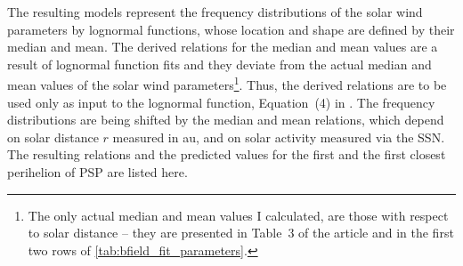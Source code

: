 \bigskip

The resulting models represent the frequency distributions of the solar wind parameters by lognormal functions, whose location and shape are defined by their median and mean.
The derived relations for the median and mean values are a result of lognormal function fits and they deviate from the actual median and mean values of the solar wind parameters\footnote{The only actual median and mean values I calculated, are those with respect to solar distance -- they are presented in Table~3 of the article and in the first two rows of \autoref{tab:bfield_fit_parameters}.}. Thus, the derived relations are to be used only as input to the lognormal function, Equation~(4) in \citet{Venzmer2018}.
The frequency distributions are being shifted by the median and mean relations, which depend on solar distance $r$ measured in au, and on solar activity measured via the SSN. The resulting relations and the predicted values for the first and the first closest perihelion of PSP are listed here.
